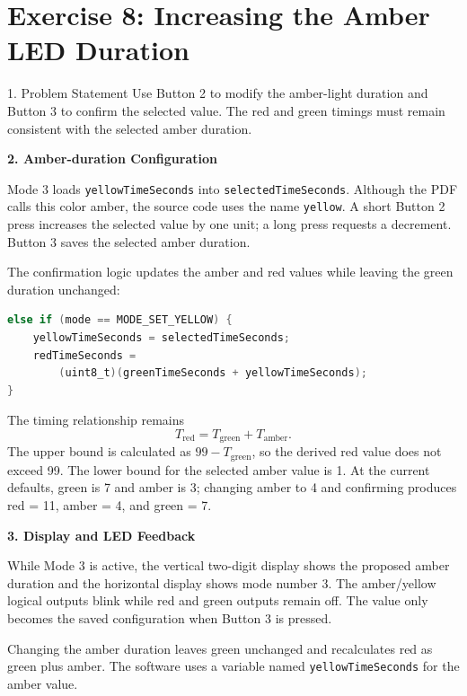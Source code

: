 \clearpage
\section*{Exercise 8: Increasing the Amber LED Duration}

\begin{questionbox}{1. Problem Statement}
Use Button 2 to modify the amber-light duration and Button 3 to confirm the selected value. The red and green timings must remain consistent with the selected amber duration.
\end{questionbox}

\vspace{0.4cm}
\textbf{2. Amber-duration Configuration}

Mode 3 loads \texttt{yellowTimeSeconds} into \texttt{selectedTimeSeconds}. Although the PDF calls this color amber, the source code uses the name \texttt{yellow}. A short Button 2 press increases the selected value by one unit; a long press requests a decrement. Button 3 saves the selected amber duration.

The confirmation logic updates the amber and red values while leaving the green duration unchanged:

\begin{lstlisting}[language=C, caption={Amber timing confirmation}, label={lst:exercise8_amber_confirm}, captionpos=b]
else if (mode == MODE_SET_YELLOW) {
    yellowTimeSeconds = selectedTimeSeconds;
    redTimeSeconds =
        (uint8_t)(greenTimeSeconds + yellowTimeSeconds);
}
\end{lstlisting}

The timing relationship remains
\[
    T_{\mathrm{red}} = T_{\mathrm{green}} + T_{\mathrm{amber}}.
\]
The upper bound is calculated as \(99 - T_{\mathrm{green}}\), so the derived red value does not exceed 99. The lower bound for the selected amber value is 1. At the current defaults, green is 7 and amber is 3; changing amber to 4 and confirming produces red = 11, amber = 4, and green = 7.

\textbf{3. Display and LED Feedback}

While Mode 3 is active, the vertical two-digit display shows the proposed amber duration and the horizontal display shows mode number 3. The amber/yellow logical outputs blink while red and green outputs remain off. The value only becomes the saved configuration when Button 3 is pressed.

\begin{resultbox}
Changing the amber duration leaves green unchanged and recalculates red as green plus amber. The software uses a variable named \texttt{yellowTimeSeconds} for the amber value.
\end{resultbox}

